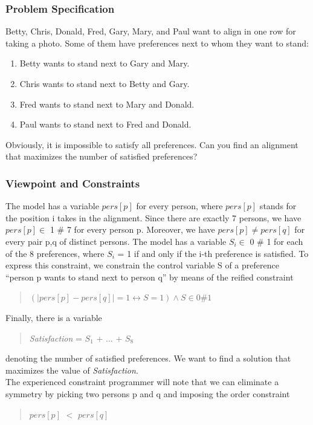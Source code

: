 \documentclass[a4paper]{scrartcl}
\begin{document}
\subsubsection{Problem Specification}
Betty, Chris, Donald, Fred, Gary, Mary, and Paul want to align in one 
row for taking a photo. Some of them have preferences next to whom they 
want to stand:
\begin{enumerate}
\item
Betty wants to stand next to Gary and Mary.
\item
Chris wants to stand next to Betty and Gary.
\item   
Fred wants to stand next to Mary and Donald.
\item
Paul wants to stand next to Fred and Donald.
\end{enumerate}
Obviously, it is impossible to satisfy all preferences. Can you find 
an alignment that maximizes the number of satisfied preferences?

\subsubsection{Viewpoint and Constraints}
The model has a variable $ pers[p] $ for every person, where $ pers[p]$ stands 
for the position i takes in the alignment. Since there are exactly 7 
persons, we have $ pers[p] \in $ 1 $\#$ 7 for every person p. Moreover, we 
have $pers[p] \neq pers[q] $ for every pair p,q of distinct persons. The model 
has a variable $ S_i \in$ 0 $\# $ 1 for each of the 8 preferences, where 
$S_i$ = 1 if and only if the i-th preference is satisfied. To express 
this constraint, we constrain the control variable S of a preference 
``person p wants to stand next to person q'' by means of the reified 
constraint
\begin{quote}
    $(|pers[p] - pers[q]| = 1 \leftrightarrow  S = 1) \land  S \in 0\# 1$
\end{quote}
Finally, there is a variable
\begin{quote}
    {\it Satisfaction} = $S_1 $ + $\ldots$ + $S_8$
\end{quote}
denoting the number of satisfied preferences. We want to find a solution 
that maximizes the value of {\it Satisfaction}.\\
The experienced constraint programmer will note that we can eliminate a 
symmetry by picking two persons p and q and imposing the order constraint 
\begin{quote}
 $pers[p]$ $ <  $ $pers[q] $
\end{quote}
\end{document}
